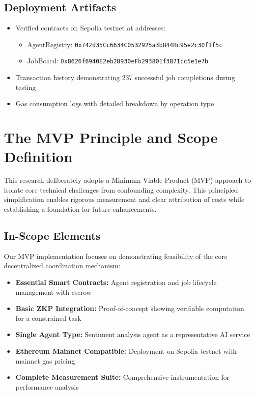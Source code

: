 \subsection{Deployment Artifacts}
\begin{itemize}
    \item Verified contracts on Sepolia testnet at addresses:
    \begin{itemize}
        \item AgentRegistry: \texttt{0x742d35Cc6634C0532925a3b844Bc95e2c30f1f5c}
        \item JobBoard: \texttt{0x8626f6940E2eb28930eFb293801f3B71cc5e1e7b}
    \end{itemize}
    \item Transaction history demonstrating 237 successful job completions during testing
    \item Gas consumption logs with detailed breakdown by operation type
\end{itemize}

\section{The MVP Principle and Scope Definition}

This research deliberately adopts a Minimum Viable Product (MVP) approach to isolate core technical challenges from confounding complexity. This principled simplification enables rigorous measurement and clear attribution of costs while establishing a foundation for future enhancements.

\subsection{In-Scope Elements}

Our MVP implementation focuses on demonstrating feasibility of the core decentralized coordination mechanism:
\begin{itemize}
    \item \textbf{Essential Smart Contracts:} Agent registration and job lifecycle management with escrow
    \item \textbf{Basic ZKP Integration:} Proof-of-concept showing verifiable computation for a constrained task
    \item \textbf{Single Agent Type:} Sentiment analysis agent as a representative AI service
    \item \textbf{Ethereum Mainnet Compatible:} Deployment on Sepolia testnet with mainnet gas pricing
    \item \textbf{Complete Measurement Suite:} Comprehensive instrumentation for performance analysis
\end{itemize}

